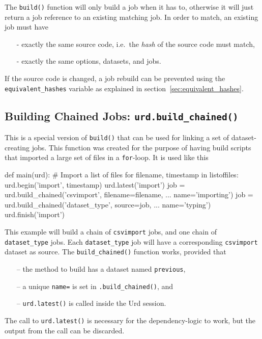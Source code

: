 The \texttt{build()} function will only build a job when it has to,
otherwise it will just return a job reference to an existing matching
job.  In order to match, an existing job must have
\begin{itemize}
\item[-] exactly the same source code, i.e.\ the \textsl{hash} of the source code must match,
\item[-] exactly the same options, datasets, and jobs.
\end{itemize}
If the source code is changed, a job rebuild can be prevented using
the \texttt{equivalent\_hashes} variable as explained in
section~\ref{sec:equivalent_hashes}.



\subsection{Building Chained Jobs: \texttt{urd.build\_chained()}}
This is a special version of \texttt{build()} that can be used for
linking a set of dataset-creating jobs.  This function was created for
the purpose of having build scripts that imported a large set of files
in a \texttt{for}-loop.  It is used like this
\begin{python}
def main(urd):
    # Import a list of files
    for filename, timestamp in listoffiles:
        urd.begin('import', timestamp)
        urd.latest('import')
        job = urd.build_chained('csvimport',
                                filename=filename,
                                ...
                                name='importing')
        job = urd.build_chained('dataset_type',
                                source=job,
                                ...
                                name='typing')
        urd.finish('import')
\end{python}
This example will build a chain of \texttt{csvimport} jobs, and one
chain of \texttt{dataset\_type} jobs.  Each \texttt{dataset\_type} job
will have a corresponding \texttt{csvimport} dataset as source.
The \texttt{build\_chained()} function works, provided that
\begin{itemize}
\item[--] the method to build has a dataset named \texttt{previous},
\item[--] a unique \texttt{name=} is set in \texttt{.build\_chained()}, and
\item[--] \texttt{urd.latest()} is called inside the Urd session.
\end{itemize}
The call to \texttt{urd.latest()} is necessary for the
dependency-logic to work, but the output from the call can be
discarded.






